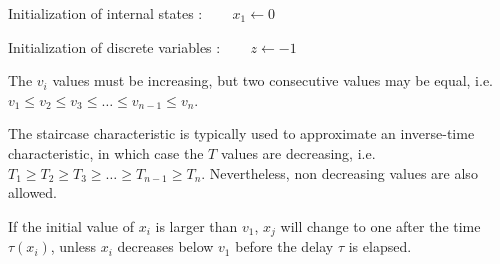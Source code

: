 \vspace*{2ex}
Initialization of internal states : ~~~ $x_1 \gets 0$

\vspace*{2ex}
Initialization of discrete variables : ~~~ $z \gets -1$


The $v_i$ values must be increasing, but two consecutive values may be equal, i.e. $v_1 \le v_2 \le v_3 \le \ldots \le v_{n-1} \le v_n$.

The staircase characteristic is typically used to approximate an inverse-time characteristic, in which case the $T$ values are decreasing, i.e. $T_1 \ge T_2 \ge T_3 \ge \ldots \ge T_{n-1} \ge T_n$. Nevertheless, non decreasing values are also allowed.

If the initial value of $x_i$ is larger than $v_1$, $x_j$ will change to one after the time $\tau(x_i)$, unless $x_i$ decreases below $v_1$ before the delay $\tau$ is elapsed.